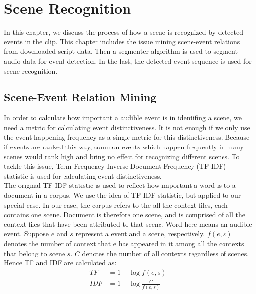 \chapter{Scene Recognition}
In this chapter, we discuss the process of how a scene is recognized by detected events in the clip. 
This chapter includes the issue mining scene-event relations from downloaded script data.
Then a segmenter algorithm is used to segment audio data for event detection. 
In the last, the detected event sequence is used for scene recognition. 

\section{Scene-Event Relation Mining}

In order to calculate how important a audible event is in identifing a scene, we need a metric for calculating event distinctiveness. 
It is not enough if we only use the event happening frequency as a single metric for this distinctiveness. 
Because if events are ranked this way, common events which happen frequently in many scenes would rank high and bring no effect for recognizing different scenes. 
To tackle this issue, Term Frequency-Inverse Document Frequency (TF-IDF) statistic is used for calculating event distinctiveness. \\ 

The original TF-IDF statistic is used to reflect how important a word is to a document in a corpus. 
We use the idea of TF-IDF statistic, but applied to our special case. 
In our case, the corpus refers to the all the context files, each contains one scene. 
Document is therefore one scene, and is comprised of all the context files that have been attributed to that scene. 
Word here means an audible event. 
Suppose $e$ and $s$ represent a event and a scene, respectively. 
$f(e,s)$ denotes the number of context that e has appeared in it among all the contexts that belong to scene $s$.  
$C$ denotes the number of all contexts regardless of scenes. 
Hence TF and IDF are calculated as: 
\begin{equation}
\begin{split}
 TF &= 1 + \log{f(e,s)} \\ 
 IDF &= 1 + \log{\frac{C}{f(e,s)}}
\end{split}
\end{equation} 

